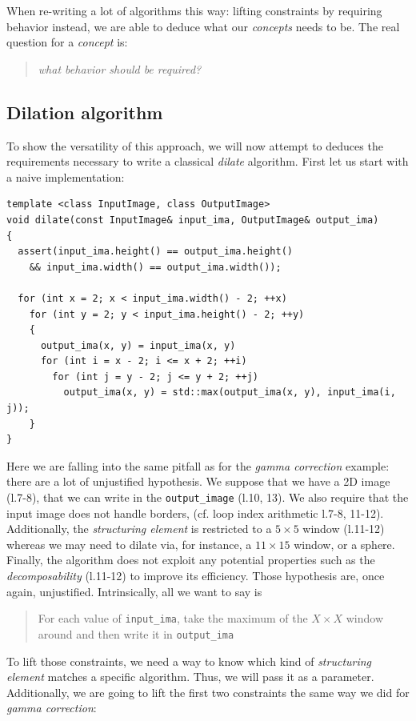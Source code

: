 \noindent When re-writing a lot of algorithms this way: lifting constraints by requiring behavior instead, we are able
to deduce what our \emph{concepts} needs to be. The real question for a \emph{concept} is: \blockquote{\emph{what
    behavior should be required?}}



\subsection{Dilation algorithm}
\label{subsec:dilation}

To show the versatility of this approach, we will now attempt to deduces the requirements necessary to write a classical
\emph{dilate} algorithm. First let us start with a naive implementation:

\begin{verbatim}
template <class InputImage, class OutputImage>
void dilate(const InputImage& input_ima, OutputImage& output_ima)
{
  assert(input_ima.height() == output_ima.height()
    && input_ima.width() == output_ima.width());

  for (int x = 2; x < input_ima.width() - 2; ++x)
    for (int y = 2; y < input_ima.height() - 2; ++y)
    {
      output_ima(x, y) = input_ima(x, y)
      for (int i = x - 2; i <= x + 2; ++i)
        for (int j = y - 2; j <= y + 2; ++j)
          output_ima(x, y) = std::max(output_ima(x, y), input_ima(i, j));
    }
}
\end{verbatim}

\noindent Here we are falling into the same pitfall as for the \emph{gamma correction} example: there are a lot of
unjustified hypothesis. We suppose that we have a 2D image (l.7-8), that we can write in the \texttt{output\_image}
(l.10, 13). We also require that the input image does not handle borders, (cf. loop index arithmetic l.7-8, 11-12).
Additionally, the \emph{structuring element} is restricted to a $5 \times 5$ window (l.11-12) whereas we may need to
dilate via, for instance, a $11 \times 15$ window, or a sphere. Finally, the algorithm does not exploit any potential
properties such as the \emph{decomposability} (l.11-12) to improve its efficiency. Those hypothesis are, once again,
unjustified. Intrinsically, all we want to say is \blockquote{For each value of \texttt{input\_ima}, take the maximum
  of the $X \times X$ window around and then write it in \texttt{output\_ima}}.

To lift those constraints, we need a way to know which kind of \emph{structuring element} matches a specific algorithm.
Thus, we will pass it as a parameter. Additionally, we are going to lift the first two constraints the same way we did
for \emph{gamma correction}:

